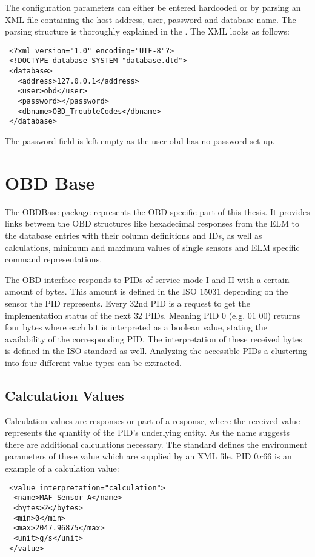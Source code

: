 The configuration parameters can either be entered hardcoded or by parsing an XML file containing the host address, user, password and database 
name. The parsing structure is thoroughly explained in the . The XML looks as follows:

\begin{verbatim}
 <?xml version="1.0" encoding="UTF-8"?>
 <!DOCTYPE database SYSTEM "database.dtd">
 <database>
   <address>127.0.0.1</address>
   <user>obd</user>
   <password></password>
   <dbname>OBD_TroubleCodes</dbname>
 </database>
\end{verbatim}

The password field is left empty as the user obd has no password set up.

\section{OBD Base}
\label{sec:obdbase}
The OBDBase package represents the OBD specific part of this thesis. It provides links between the OBD structures like hexadecimal responses 
from the ELM to the database entries with their column definitions and IDs, as well as calculations, minimum and maximum values of single 
sensors and ELM specific command representations.

The OBD interface responds to PIDs of service mode I and II with a certain amount of bytes. This amount is defined in the ISO $15031$ \cite{ISO15031} depending 
on the sensor the PID represents. Every $32$nd PID is a request to get the implementation status of the next $32$ PIDs. Meaning 
PID $0$ (e.g. $01$ $00$) returns four bytes where each bit is interpreted as a boolean value, stating the availability of the corresponding PID. The 
interpretation of these received bytes is defined in the ISO standard as well. Analyzing the accessible PIDs a clustering into four different value types can be extracted.

\subsection{Calculation Values}
Calculation values are responses or part of a response, where the received value represents the quantity of the PID’s underlying entity. 
As the name suggests there are additional calculations necessary. The standard defines the environment parameters of these value which are 
supplied by an XML file. PID $0x66$ is an example of a calculation value:

\begin{verbatim}
 <value interpretation="calculation">
  <name>MAF Sensor A</name>
  <bytes>2</bytes>
  <min>0</min>
  <max>2047.96875</max>
  <unit>g/s</unit>
 </value>
\end{verbatim}

